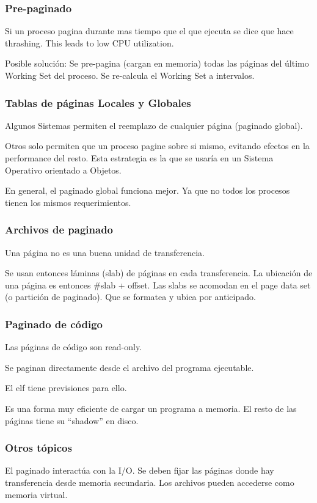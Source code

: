 \documentclass[a4paper, twoside]{article}
\begin{document}
\subsubsection{Pre-paginado}
Si un proceso pagina durante mas tiempo que el que ejecuta se dice que hace thrashing. This leads to low CPU utilization.

Posible solución: Se pre-pagina (cargan en memoria) todas las páginas del último Working Set del proceso. Se re-calcula el Working Set a intervalos.

\subsubsection{Tablas de páginas Locales y Globales}
Algunos Sistemas permiten el reemplazo de cualquier página (paginado global).

Otros solo permiten que un proceso pagine sobre si mismo, evitando efectos en la performance del resto. Esta estrategia es la que se usaría en un Sistema Operativo orientado a Objetos.

En general, el paginado global funciona mejor. Ya que no todos los procesos tienen los mismos requerimientos.

\subsubsection{Archivos de paginado}
Una página no es una buena unidad de transferencia.

Se usan entonces láminas (slab) de páginas en cada transferencia. La ubicación de una página es entonces \#slab + offset. Las slabs se acomodan en el page data set (o partición de paginado). Que se formatea y ubica por anticipado.

\subsubsection{Paginado de código}
Las páginas de código son read-only.

Se paginan directamente desde el archivo del programa ejecutable.

El elf tiene previsiones para ello.

Es una forma muy eficiente de cargar un programa a memoria. El resto de las páginas tiene su ``shadow'' en disco.

\subsubsection{Otros tópicos}
El paginado interactúa con la I/O. Se deben fijar las páginas donde hay transferencia desde memoria secundaria. Los archivos pueden accederse como memoria virtual.
\end{document}
